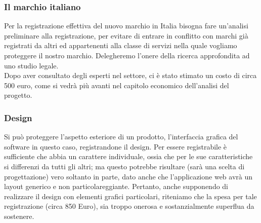 \subsubsection{Il marchio italiano}
Per la registrazione effettiva del nuovo marchio in Italia bisogna fare un'analisi preliminare alla registrazione, per evitare di entrare in conflitto con marchi già registrati da altri ed appartenenti alla classe di servizi nella quale vogliamo proteggere il nostro marchio. Delegheremo l'onere della ricerca approfondita ad uno studio legale.\\
Dopo aver consultato degli esperti nel settore, ci è stato stimato un costo di circa 500 euro, come si vedrà più avanti nel capitolo economico dell'analisi del progetto.

\subsubsection{Design}
Si può proteggere l'aspetto esteriore di un prodotto, l'interfaccia grafica del software in questo caso, registrandone il design. Per essere registrabile è sufficiente che abbia un carattere individuale, ossia che per le sue caratteristiche si differenzi da tutti gli altri; ma questo potrebbe risultare (sarà una scelta di progettazione) vero soltanto in parte, dato anche che l'applicazione web avrà un layout generico e non particolareggiante. Pertanto, anche supponendo di realizzare il design con elementi grafici particolari, riteniamo che la spesa per tale registrazione (circa 850 Euro), sia troppo onerosa e sostanzialmente superflua da sostenere.

